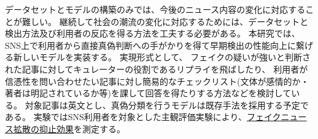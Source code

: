 
\vspace{20pt}
データセットとモデルの構築のみでは、今後のニュース内容の変化に対応することが難しい。
継続して社会の潮流の変化に対応するためには、データセットと検出方法及び利用者の反応を得る方法を工夫する必要がある。
本研究では、SNS上で利用者から直接真偽判断への手がかりを得て早期検出の性能向上に繋げる新しいモデルを実装する。
実現形式として、
フェイクの疑いが強いと判断された記事に対してキュレーターの役割であるリプライを飛ばしたり、
利用者が信憑性を問い合わせたい記事に対し簡易的なチェックリスト(文体が感情的か・著者は明記されているか等)を課して回答を得たりする方法などを検討している。
対象記事は英文とし、真偽分類を行うモデルは既存手法を採用する予定である。
実験ではSNS利用者を対象とした主観評価実験により、\underline{フェイクニュース拡散の抑止効果}を測定する。



